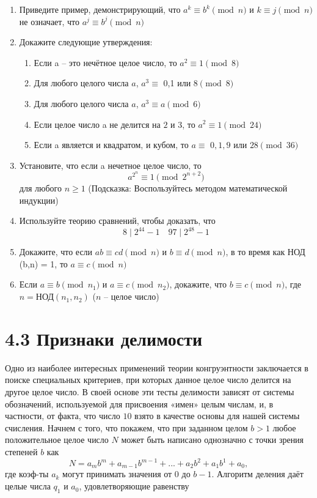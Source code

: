 \documentclass[11pt]{article}
\begin{document}
\begin{enumerate}
\thispagestyle{fancy}
\rhead{\thepage}
\item Приведите пример, демонстрирующий, что $a^{k}\equiv b^{k} \pmod {n}$ и $k\equiv j \pmod {n}$ не означает, что $a^{j}\equiv b^{j} \pmod {n}$
\item Докажите следующие утверждения:
\begin{enumerate}
	\item Если a -- это нечётное целое число, то $a^{2}\equiv 1\pmod {8} $
	\item Для любого целого числа $a$, $a^{3}\equiv$ 0,1 или 8$\pmod {8}$
	\item Для любого целого числа $a$, $a^{3}\equiv a\pmod {6}$
	\item Если целое число a не делится на $2$ и $3$, то $a^{2} \equiv 1\pmod {24}$
	\item Если a является и квадратом, и кубом, то  $a \equiv$ $0,1,9$ или $28$$\pmod {36}$
\end{enumerate}
\item Установите, что если a нечетное целое число, то $$a^{2^{n}}\equiv 1\pmod {2^{n+2}}$$ для любого $n \geq 1$ (Подсказка: Воспользуйтесь методом математической индукции)
\item Используйте теорию сравнений, чтобы доказать, что $$8\mid 2^{44}-1 \quad 97\mid2^{48}-1$$
\item Докажите, что если $ab\equiv cd \pmod {n}$ и $b\equiv d \pmod {n}$, в то время как НОД (b,n) = 1, то $a\equiv c \pmod {n}$
\item Если $a\equiv b \pmod {n_1}$ и $a\equiv c \pmod {n_2}$, докажите, что $b\equiv c \pmod {n}$, где \\
$n = \text{НОД} (n_1,n_2)$ ($n$ -- целое число)
\end{enumerate}

\section* {4.3 Признаки делимости}
Одно из наиболее интересных применений теории конгруэнтности заключается в поиске специальных критериев, при которых данное целое число делится на другое целое число. В своей основе эти тесты делимости зависят от системы обозначений, используемой для присвоения «имен» целым числам, и, в частности, от факта, что число $10$ взято в качестве основы для нашей системы счисления. Начнем с того, что покажем, что при заданном целом $b>1$ любое положительное целое число $N$ может быть написано однозначно с точки зрения степеней $b$ как
\[N = a_mb^{m} + a_{m-1}b^{m-1} + ... + a_{2}b^{2} + a_{1}b^{1} + a_{0},\] где коэф-ты $a_{k}$ могут принимать значения от $0$ до $b-1$. Алгоритм деления даёт целые числа $q_{1}$ и $a_{0}$, удовлетворяющие равенству 
\end{document}
